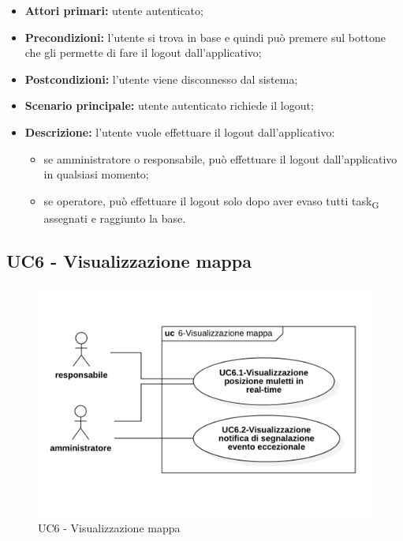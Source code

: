 \begin{itemize}
	\item 	\textbf{Attori primari:} utente autenticato;
	\item 	\textbf{Precondizioni:} l'utente si trova in base e quindi può premere sul bottone che gli permette di fare il logout dall'applicativo;
	\item 	\textbf{Postcondizioni:} l'utente viene disconnesso dal sistema;
	\item 	\textbf{Scenario principale:} utente autenticato richiede il logout;
	\item 	\textbf{Descrizione:} l'utente vuole effettuare il logout dall'applicativo:
	\begin{itemize}
		\item se amministratore o responsabile, può effettuare il logout dall'applicativo in qualsiasi momento;
		\item se operatore, può effettuare il logout solo dopo aver evaso tutti task\textsubscript{G} assegnati e raggiunto la base.
	\end{itemize}
\end{itemize}


\subsection{UC6 - Visualizzazione mappa}

\begin{figure}[H]
	\centering
	\includegraphics[scale=0.52]{res/images/uc6.png}
	\caption{UC6 - Visualizzazione mappa}
\end{figure}

